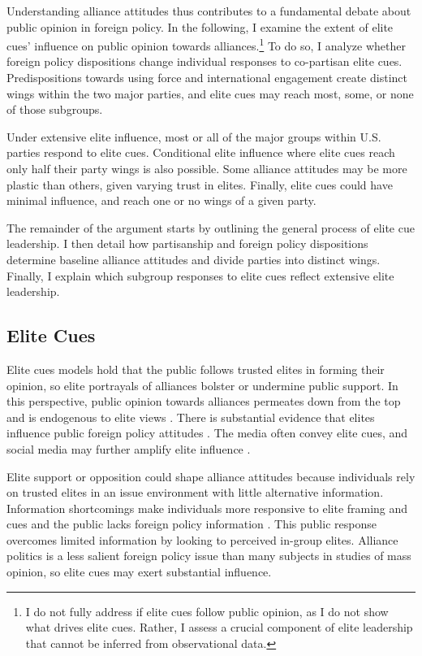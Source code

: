 \documentclass[12pt]{article}
\begin{document}
Understanding alliance attitudes thus contributes to a fundamental debate about public opinion in foreign policy. 
In the following, I examine the extent of elite cues' influence on public opinion towards alliances.\footnote{I do not fully address if elite cues follow public opinion, as I do not show what drives elite cues. Rather, I assess a crucial component of elite leadership that cannot be inferred from observational data.}
To do so, I analyze whether foreign policy dispositions change individual responses to co-partisan elite cues.
Predispositions towards using force and international engagement create distinct wings within the two major parties, and elite cues may reach most, some, or none of those subgroups.


Under extensive elite influence, most or all of the major groups within U.S. parties respond to elite cues. 
Conditional elite influence where elite cues reach only half their party wings is also possible. 
Some alliance attitudes may be more plastic than others, given varying trust in elites. 
Finally, elite cues could have minimal influence, and reach one or no wings of a given party.


The remainder of the argument starts by outlining the general process of elite cue leadership.
I then detail how partisanship and foreign policy dispositions determine baseline alliance attitudes and divide parties into distinct wings.
Finally, I explain which subgroup responses to elite cues reflect extensive elite leadership. 


\subsection{Elite Cues} 


Elite cues models hold that the public follows trusted elites in forming their opinion, so elite portrayals of alliances bolster or undermine public support.
In this perspective, public opinion towards alliances permeates down from the top and is endogenous to elite views \citep{Druckman2014}.
There is substantial evidence that elites influence public foreign policy attitudes \citep{BaumPotter2008}. 
The media often convey elite cues, and social media may further amplify elite influence \citep{BaumPotter2019}.   


Elite support or opposition could shape alliance attitudes because individuals rely on trusted elites in an issue environment with little alternative information. 
Information shortcomings make individuals more responsive to elite framing and cues \citep{Druckman2001, Peterson2017} and the public lacks foreign policy information \citep{BaumPotter2008}.
This public response overcomes limited information by looking to perceived in-group elites. 
Alliance politics is a less salient foreign policy issue than many subjects in studies of mass opinion, so elite cues may exert substantial influence.
\end{document}
